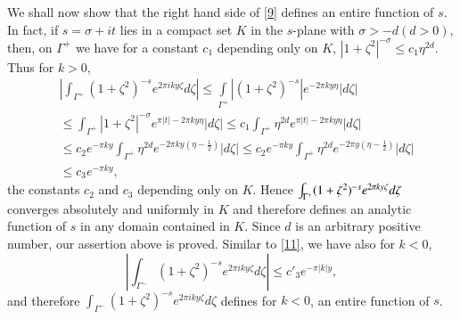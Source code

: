 We shall now show that the right hand side of \eqref{9} defines an
entire function of $s$. In fact, if $s=\sigma+it$ lies in a compact
set $K$ in the $s$-plane with $\sigma>-d(d>0)$, then, on $\Gamma^{+}$
we have for a constant $c_{1}$ depending only on $K$,
$|1+\zeta^{2}|^{-\sigma}\leq c_{1}\eta^{2d}$. Thus for $k>0$,
\begin{align*}
& \left|\int_{\Gamma^{+}}(1+\zeta^{2})^{-s}e^{2\pi
  iky\zeta}d\zeta\right|\leq
\int\limits_{\Gamma^{+}}|(1+\zeta^{2})^{-s}|e^{-2\pi ky\eta}|d\zeta|\\
&\leq \int_{\Gamma^{+}}|1+\zeta^{2}|^{-\sigma}e^{\pi|t|-2\pi
  ky\eta}|d\zeta|\leq c_{1}\int_{\Gamma^{+}}\eta^{2d}e^{\pi |t|-2\pi
  ky\eta}|d\zeta|\\
&\leq c_{2}e^{-\pi ky}\int_{\Gamma^{+}}\eta^{2d}e^{-2\pi
  ky(\eta-\frac{1}{2})}|d\zeta|\leq c_{2}e^{-\pi
  ky}\int_{\Gamma^{+}}\eta^{2d}e^{-2\pi y(\eta-\frac{1}{2})}|d\zeta|\\
&\leq c_{3}e^{-\pi ky},\tag{11}\label{11}
\end{align*}\pageoriginale
the constants $c_{2}$ and $c_{3}$ depending only on $K$. Hence
$\int_{\Gamma^{+}}(1+\zeta^{2})^{-s}\break e^{2\pi ky\zeta}d\zeta$ converges
absolutely and uniformly in $K$ and therefore defines an analytic
function of $s$ in any domain contained in $K$. Since $d$ is an
arbitrary positive number, our assertion above is proved. Similar to
\eqref{11}, we have also for $k<0$,
\begin{equation*}
\left|\int_{\Gamma^{-}}(1+\zeta^{2})^{-s}e^{2\pi
  iky\zeta}d\zeta\right|\leq c'_{3}e^{-\pi|k|y},\tag{12}\label{12}
\end{equation*}
and therefore $\int_{\Gamma^{-}}(1+\zeta^{2})^{-s}e^{2\pi
  iky\zeta}d\zeta$ defines for $k<0$, an entire function of $s$.

